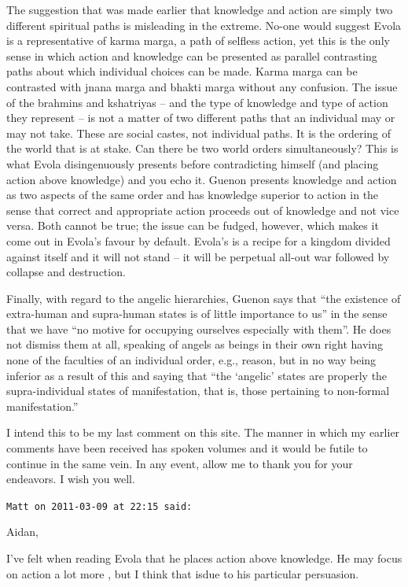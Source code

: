 \begin{footnotesize}
\begin{sffamily}
The suggestion that was made earlier that knowledge and action are simply two different spiritual paths is misleading in the extreme. No-one would suggest Evola is a representative of karma marga, a path of selfless action, yet this is the only sense in which action and knowledge can be presented as parallel contrasting paths about which individual choices can be made. Karma marga can be contrasted with jnana marga and bhakti marga without any confusion. The issue of the brahmins and kshatriyas -- and the type of knowledge and type of action they represent -- is not a matter of two different paths that an individual may or may not take. These are social castes, not individual paths. It is the ordering of the world that is at stake. Can there be two world orders simultaneously? This is what Evola disingenuously presents before contradicting himself (and placing action above knowledge) and you echo it. Guenon presents knowledge and action as two aspects of the same order and has knowledge superior to action in the sense that correct and appropriate action proceeds out of knowledge and not vice versa. Both cannot be true; the issue can be fudged, however, which makes it come out in Evola's favour by default. Evola's is a recipe for a kingdom divided against itself and it will not stand -- it will be perpetual all-out war followed by collapse and destruction.

Finally, with regard to the angelic hierarchies, Guenon says that ``the existence of extra-human and supra-human states is of little importance to us'' in the sense that we have ``no motive for occupying ourselves especially with them''. He does not dismiss them at all, speaking of angels as beings in their own right having none of the faculties of an individual order, e.g., reason, but in no way being inferior as a result of this and saying that ``the `angelic' states are properly the supra-individual states of manifestation, that is, those pertaining to non-formal manifestation.''

I intend this to be my last comment on this site. The manner in which my earlier comments have been received has spoken volumes and it would be futile to continue in the same vein. In any event, allow me to thank you for your endeavors. I wish you well.

\hfill

\texttt{Matt on 2011-03-09 at 22:15 said:}

Aidan,

I've felt when reading Evola that he places action above knowledge. He may focus on action a lot more , but I think that isdue to his particular persuasion.


\end{sffamily}
\end{footnotesize}

